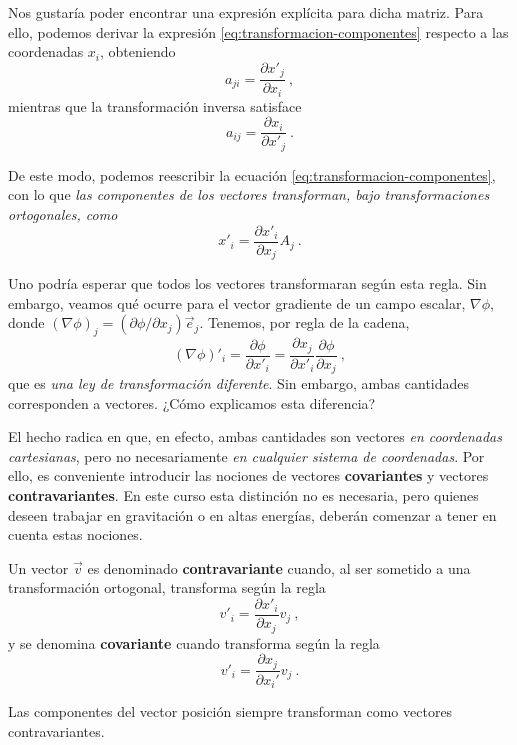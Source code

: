 Nos gustaría poder encontrar una expresión explícita para dicha matriz. Para ello, podemos derivar la expresión \eqref{eq:transformacion-componentes} respecto a las coordenadas $x_i$, obteniendo
\begin{equation}
    a_{ji} = \frac{\partial x'_j}{\partial x_i} \ ,
\end{equation}
mientras que la transformación inversa satisface
\begin{equation}
    a_{ij} = \frac{\partial x_i}{\partial x'_j} \ .
\end{equation}

De este modo, podemos reescribir la ecuación \eqref{eq:transformacion-componentes}, con lo que \emph{las componentes de los vectores transforman, bajo transformaciones ortogonales, como}
\begin{equation}
    x'_i = \frac{\partial x'_i}{\partial x_j} A_j \ .
\end{equation}

Uno podría esperar que todos los vectores transformaran según esta regla. Sin embargo, veamos qué ocurre para el vector gradiente de un campo escalar, $\nabla\phi$, donde $(\nabla \phi)_j = (\partial \phi/\partial x_j )\vec{e}_j$. Tenemos, por regla de la cadena,
\begin{equation}
    (\nabla \phi)'_i = \frac{\partial \phi}{\partial x'_i} = \frac{\partial x_j}{\partial x'_i} \frac{\partial \phi}{\partial x_j} \ ,
\end{equation}
que es \emph{una ley de transformación diferente}. Sin embargo, ambas cantidades corresponden a vectores. ¿Cómo explicamos esta diferencia?

El hecho radica en que, en efecto, ambas cantidades son vectores \emph{en coordenadas cartesianas}, pero no necesariamente \emph{en cualquier sistema de coordenadas}. Por ello, es conveniente introducir las nociones de vectores \textbf{covariantes} y vectores \textbf{contravariantes}. En este curso esta distinción no es necesaria, pero quienes deseen trabajar en gravitación o en altas energías, deberán comenzar a tener en cuenta estas nociones.

\begin{defi}
    Un vector $\vec{v}$ es denominado \textbf{contravariante} cuando, al ser sometido a una transformación ortogonal, transforma según la regla
    \begin{equation} \label{eq:contravariante}
        v'_i = \frac{\partial x'_i}{\partial x_j} v_j \ ,
    \end{equation}
    y se denomina \textbf{covariante} cuando transforma según la regla
    \begin{equation} \label{eq:covariante}
        v'_i = \frac{\partial x_j}{\partial x_i'} v_j \ .
    \end{equation}

    Las componentes del vector posición siempre transforman como vectores contravariantes.
\end{defi}


